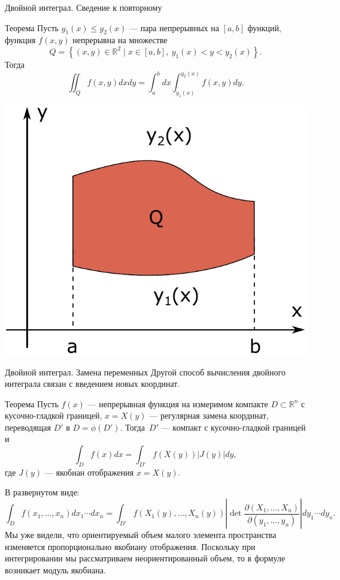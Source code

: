 \documentclass[8pt]{beamer}
\newcommand{\pp}[2]{\frac{\partial #1}{\partial #2}}
\begin{document}
\begin{frame}{Двойной интеграл. Сведение к повторному}
\begin{block}{Теорема}
Пусть $y_1(x)\le y_2(x)$ --- пара непрерывных на $[a,b]$ функций, функция $f(x,y)$ непрерывна на множестве
$$Q =\left\{ (x,y)\in\mathbb{R}^2 \mid
 x\in[a,b],\ y_1(x)<y<y_2(x) \right\}.$$
Тогда
$$\iint_Q f(x,y)dxdy =\int_a^b dx \int_{y_1(x)}^{y_2(x)}f(x,y)dy.$$
\end{block}
\begin{center}
\includegraphics[scale=0.4]{iintQ.pdf}
\end{center}
\end{frame}

\begin{frame}{Двойной интеграл. Замена переменных}
Другой способ вычисления двойного интеграла связан с введением новых координат.
\begin{block}{Теорема}
Пусть $f(x)$ --- непрерывная функция на измеримом компакте $D\subset\mathbb{R}^n$ с кусочно-гладкой границей,  $x = X(y)$ --- регулярная замена координат, переводящая $D'$ в $D = \phi(D')$. Тогда~$D'$ --- компакт с кусочно-гладкой границей и
$$\int_D f(x)dx= \int_{D'} f(X(y))|J(y)|dy,$$
где $J(y)$ --- якобиан отображения $x=X(y)$.
\end{block}
В развернутом виде:
$$\int_D f(x_1,\ldots, x_n)dx_1\cdots dx_n= \int_{D'} f(X_1(y),\ldots, X_n(y))\left| \det \pp{(X_1,\ldots, X_n)}{(y_1,\ldots,y_n)}\right| dy_1\cdots dy_n.$$
Мы уже видели, что ориентируемый объем малого элемента пространства изменяется пропорционально якобиану отображения. Поскольку при интегрировании мы рассматриваем неориентированный объем, то в формуле возникает модуль якобиана.
\end{frame}
\end{document}

